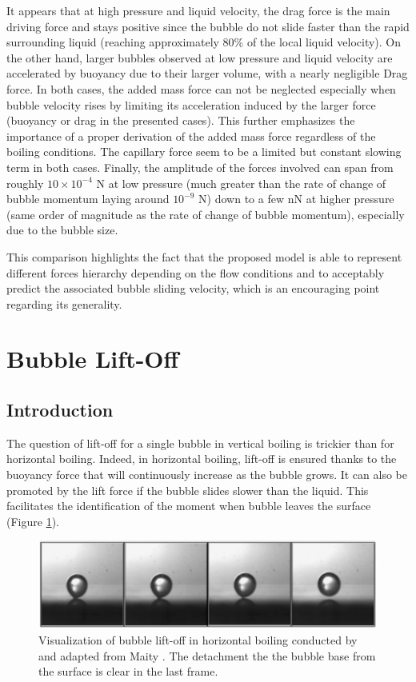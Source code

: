 \npar


It appears that at high pressure and liquid velocity, the drag force is the main driving force and stays positive since the bubble do not slide faster than the rapid surrounding liquid (reaching approximately 80\% of the local liquid velocity). On the other hand, larger bubbles observed at low pressure and liquid velocity are accelerated by buoyancy due to their larger volume, with a nearly negligible Drag force. In both cases, the added mass force can not be neglected especially when bubble velocity rises by limiting its acceleration induced by the larger force (buoyancy or drag in the presented cases). This further emphasizes the importance of a proper derivation of the added mass force regardless of the boiling conditions. The capillary force seem to be a limited but constant slowing term in both cases. Finally, the amplitude of the forces involved can span from roughly $10\times 10^{-4}$ N at low pressure (much greater than the rate of change of bubble momentum laying around $10^{-9}$ N) down to a few nN at higher pressure (same order of magnitude as the rate of change of bubble momentum), especially due to the bubble size.

\npar

This comparison highlights the fact that the proposed model is able to represent different forces hierarchy depending on the flow conditions and to acceptably predict the associated bubble sliding velocity, which is an encouraging point regarding its generality.


\section{Bubble Lift-Off}
\label{sec:liftoff}

\subsection{Introduction}

The question of lift-off for a single bubble in vertical boiling is trickier than for horizontal boiling. Indeed, in horizontal boiling, lift-off is ensured thanks to the buoyancy force that will continuously increase as the bubble grows. It can also be promoted by the lift force if the bubble slides slower than the liquid. This facilitates the identification of the moment when bubble leaves the surface (Figure \ref{fig:exp_lift_hor_maity}).

\begin{figure}[h!]
\centering
\includegraphics[width=0.7\linewidth]{img/bub_dyn/lift-off/lift_exp_hor_maity.PNG}
\caption{Visualization of bubble lift-off in horizontal boiling conducted by and adapted from Maity \cite{maity_effect_2000}. The detachment the the bubble base from the surface is clear in the last frame.} 
\label{fig:exp_lift_hor_maity}
\end{figure}

